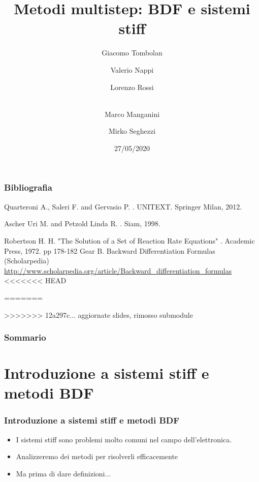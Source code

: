 \documentclass[aspectratio=169, 10pt, handout,usenames,dvipsnames]{beamer}
\title{Metodi multistep: BDF e sistemi stiff}
\date{27/05/2020}
\author{Giacomo Tombolan \and Valerio Nappi \and
      Lorenzo Rossi \and  \texorpdfstring{\\ }  MMarco Manganini \and
      Mirko Seghezzi}
\begin{document}
\begin{frame}
  \maketitle
\end{frame}


\begin{frame}


  \frametitle{Bibliografia}
  \begin{thebibliography}{99}\small

    Quarteroni A., Saleri F. and Gervasio P.
    .
    \newblock UNITEXT. Springer Milan, 2012.

    Ascher Uri M. and Petzold Linda R.
    .
    \newblock Siam, 1998.

    Robertson H. H. "The Solution of a Set of Reaction Rate Equations"
    .
    \newblock Academic Press, 1972. pp 178-182
    Gear B.
    \newblock Backward Differentiation Formulas (Scholarpedia)
    \newblock \url{http://www.scholarpedia.org/article/Backward_differentiation_formulas}
<<<<<<< HEAD

=======

>>>>>>> 12a297c... aggiornate slides, rimosso submodule

   \end{thebibliography}


\end{frame}




\begin{frame}
  \frametitle{Sommario}
  \tableofcontents
\end{frame}


\section{Introduzione a sistemi stiff e metodi BDF}\label{sec:sec1}
\begin{frame} \frametitle{Introduzione a sistemi stiff e metodi BDF}
    \begin{itemize}
        \item I sistemi stiff sono problemi molto comuni nel campo dell'elettronica.
        \item Analizzeremo dei metodi per risolverli efficacemente
        \item Ma prima di dare definizioni...
    \end{itemize}
\end{frame}
\end{document}
